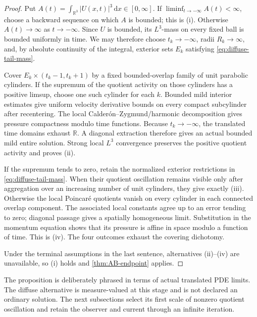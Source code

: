 \documentclass[11pt]{amsart}
\numberwithin{equation}{section}
\theoremstyle{plain}
\theoremstyle{definition}
\theoremstyle{remark}
\newcommand{\R}{\mathbb R}
\newcommand{\dd}{\,\mathrm d}
\begin{document}
\begin{proof}
Put \(A(t)=\int_{\R^3}|U(x,t)|^3\dd x\in[0,\infty]\).  If
\(\liminf_{t\to-\infty}A(t)<\infty\), choose a backward sequence on which
\(A\) is bounded; this is \textup{(i)}.  Otherwise
\(A(t)\to\infty\) as \(t\to-\infty\).  Since \(U\) is bounded, its
\(L^3\)-mass on every fixed ball is bounded uniformly in time.  We may
therefore choose \(t_k\to-\infty\), radii \(R_k\to\infty\), and, by
absolute continuity of the integral, exterior sets \(E_k\) satisfying
\eqref{eq:diffuse-tail-mass}.

Cover \(E_k\times(t_k-1,t_k+1)\) by a fixed bounded-overlap family of unit
parabolic cylinders.  If the supremum of the quotient activity on those
cylinders has a positive limsup, choose one such cylinder for each \(k\).
Bounded mild interior estimates give uniform velocity derivative bounds on
every compact subcylinder after recentering.  The local
Calder\'on--Zygmund/harmonic decomposition gives pressure compactness modulo
time functions.  Because \(t_k\to-\infty\), the translated time domains
exhaust \(\R\).  A diagonal extraction therefore gives an actual bounded
mild entire solution.  Strong local \(L^3\) convergence preserves the
positive quotient activity and proves \textup{(ii)}.

If the supremum tends to zero, retain the normalized exterior restrictions
in \eqref{eq:diffuse-tail-mass}.  When their quotient oscillation remains
visible only after aggregation over an increasing number of unit cylinders,
they give exactly \textup{(iii)}.  Otherwise the local Poincar\'e quotients
vanish on every cylinder in each connected overlap component.  The associated
local constants agree up to an error tending to zero; diagonal passage gives
a spatially homogeneous limit.  Substitution in the momentum equation shows
that its pressure is affine in space modulo a function of time.  This is
\textup{(iv)}.  The four outcomes exhaust the covering dichotomy.

Under the terminal assumptions in the last sentence, alternatives
\textup{(ii)--(iv)} are unavailable, so \textup{(i)} holds and
\cref{thm:AB-endpoint} applies.
\end{proof}

The proposition is deliberately phrased in terms of actual translated PDE
limits.  The diffuse alternative is measure-valued at this stage and is not
declared an ordinary solution.  The next subsections select its first scale of
nonzero quotient oscillation and retain the observer and current through an
infinite iteration.
\end{document}
